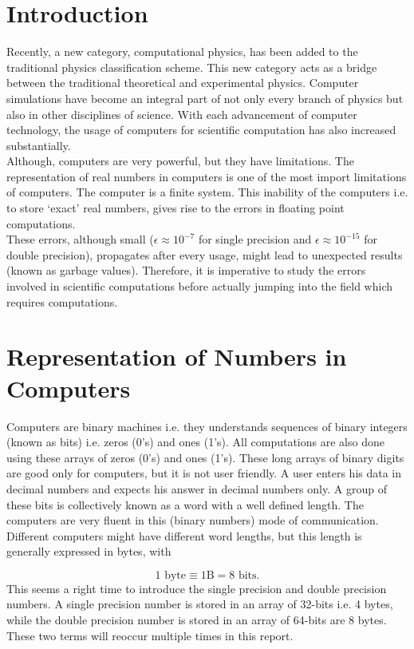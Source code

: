 \documentclass[a4,12pt]{article}
\numberwithin{equation}{subsection}
\begin{document}
\section{Introduction}
Recently, a new category, computational physics, has been added to the traditional physics classification scheme. This new category acts as a bridge between the traditional theoretical and experimental physics. Computer simulations have become an integral part of not only every branch of physics but also in other disciplines of science. With each advancement of computer technology, the usage of computers for scientific computation has also increased substantially.\\
\newline
Although, computers are very powerful, but they have limitations. The representation of real numbers in computers is one of the most import limitations of computers. The computer is a finite system. This inability of the computers i.e. to store `exact' real numbers, gives rise to the errors in floating point computations.\\
\newline
These errors, although small ($ \epsilon \approx 10^{-7}$ for single precision and $ \epsilon \approx 10^{-15}$ for double precision), propagates after every usage, might lead to unexpected results (known as garbage values). Therefore, it is imperative to study the errors involved in scientific computations before actually jumping into the field which requires computations.

\section{Representation of Numbers in Computers}
Computers are binary machines i.e. they understands sequences of binary integers (known as bits) i.e. zeros (0's) and ones (1's). All computations are also done using these arrays of zeros (0's) and ones (1's). These long arrays of binary digits are good only for computers, but it is not user friendly. A user enters his data in decimal numbers and expects his answer in decimal numbers only. A group  of these bits is collectively known as a word with a well defined length. The computers are very fluent in this (binary numbers) mode of communication. Different computers might have different word lengths, but this length is generally expressed in bytes, with 

$$1 \text{ byte} \equiv 1 \text{B} = 8 \text{ bits}.$$
\newline
This seems a right time to introduce the single precision and double precision numbers. A single precision number is stored in an array of 32-bits i.e. 4 bytes, while the double precision number is stored in an array of 64-bits are 8 bytes. These two terms will reoccur multiple times in this report.\\
\end{document}
